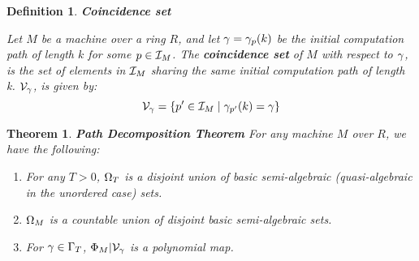 \documentclass[twoside]{article}
\newtheorem{theorem}{Theorem}[section]
\newtheorem{definition}{Definition}[section]
\begin{document}
  \begin{definition}{\textbf{Coincidence set}}

    Let $M$ be a machine over a ring $R$, and let $\gamma = \gamma_{p}(k)$ be
    the initial computation path of length $k$ for some $p \in
    \mathcal{I}_M$. The \textbf{coincidence set} of $M$ with respect to $\gamma$, is the
    set of elements in $\mathcal{I}_M$ sharing the same initial computation path of length k.
    $\mathcal{V}_{\gamma}$, is given by:
    $$\mathcal{V}_{\gamma} = 
    \{p' \in \mathcal{I}_M \mid \gamma_{p'}(k) = \gamma\}$$
    
    \emph{}

  \end{definition}

  \begin{theorem}{\textbf{Path Decomposition Theorem}}
    For any machine $M$ over $R$, we have the following:

    \begin{enumerate}
    \item For any $T > 0$, $\Omega_T$ is a disjoint union of basic
      semi-algebraic (quasi-algebraic in the unordered case) sets.

    \item $\Omega_M$ is a countable union of disjoint basic
      semi-algebraic sets.

    \item For $\gamma \in \Gamma_{T}$,
      $\Phi_M|\mathcal{V}_{\gamma}$ is a polynomial map.
    \end{enumerate}
  \end{theorem}
\end{document}
